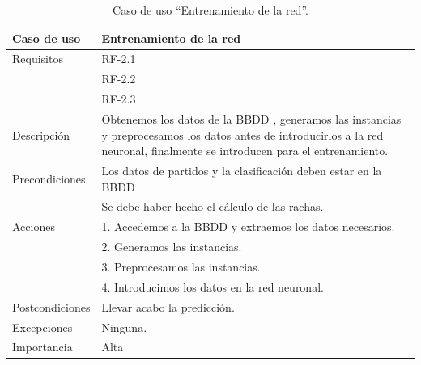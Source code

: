\begin{table}
  \begin{center}
   \begin{tabular}{|p{3cm} | p{9cm} |}
    \hline
    Caso de uso & Entrenamiento de la red\\
    \hline
    Requisitos & RF-2.1\\
    	& RF-2.2\\
	    & RF-2.3\\
    \hline
    Descripción & Obtenemos los datos de la BBDD , generamos las instancias y preprocesamos los datos antes de introducirlos a la red neuronal, finalmente se introducen para el entrenamiento.\\
    \hline
    Precondiciones &Los datos de partidos y la clasificación deben estar en la BBDD\\
    &Se debe haber hecho el cálculo de las rachas.\\
    \hline
  	Acciones & 1. Accedemos a la BBDD y extraemos los datos necesarios. \\
    &2. Generamos las instancias.\\
    &3. Preprocesamos las instancias.\\
	&4. Introducimos los datos en la red neuronal.\\
    \hline
    Postcondiciones & Llevar acabo la predicción. \\
    \hline
    Excepciones & Ninguna.\\
    \hline
    Importancia & Alta\\
    \hline
   \end{tabular}
   \caption{Caso de uso ``Entrenamiento de la red''.}
   \label{tabla:casoUso2.1}
  \end{center}
 \end{table} 
 

